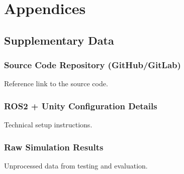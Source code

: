 \documentclass[a4paper,12pt]{report}
\begin{document}
\newpage
 
\chapter{Appendices}
\section{Supplementary Data}
\subsection{Source Code Repository (GitHub/GitLab)}
Reference link to the source code.

\subsection{ROS2 + Unity Configuration Details}
Technical setup instructions.

\subsection{Raw Simulation Results}
Unprocessed data from testing and evaluation.
\end{document}
